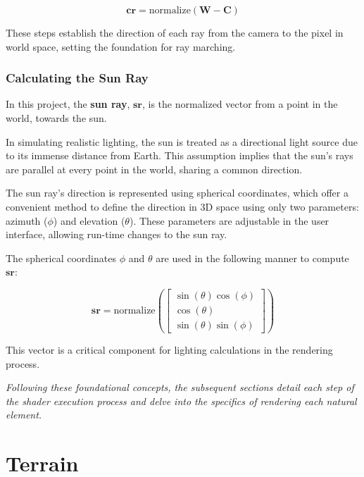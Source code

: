 \begin{equation}
   \mathbf{cr} = \text{normalize}(\mathbf{W} - \mathbf{C})
\end{equation}

These steps establish the direction of each ray from the camera to the pixel in world space, setting the foundation for ray marching.

\subsubsection{Calculating the Sun Ray}
\label{Sun Ray}

In this project, the \textbf{sun ray}, $\mathbf{sr}$, is the normalized vector from a point in the world, towards the sun. 

In simulating realistic lighting, the sun is treated as a directional light source due to its immense distance from Earth. This assumption implies that the sun's rays are parallel at every point in the world, sharing a common direction.

The sun ray's direction is represented using spherical coordinates, which offer a convenient method to define the direction in 3D space using only two parameters: azimuth ($\phi$) and elevation ($\theta$). These parameters are adjustable in the user interface, allowing run-time changes to the sun ray.

The spherical coordinates $\phi$ and $\theta$ are used in the following manner to compute $\mathbf{sr}$:

\begin{equation}
    \mathbf{sr} = \text{normalize}\left( \begin{bmatrix} \sin(\theta) \cos(\phi) \\ \cos(\theta) \\ \sin(\theta) \sin(\phi) \end{bmatrix} \right)
\end{equation}

This vector is a critical component for lighting calculations in the rendering process.

\textit{Following these foundational concepts, the subsequent sections detail each step of the shader execution process and delve into the specifics of rendering each natural element.
}

\section{Terrain}
\label{Terrain}

